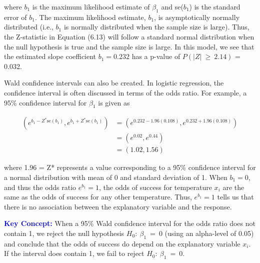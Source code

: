 \documentclass[
]{report}
\begin{document}
where \(\scriptstyle b_1\) is the maximum likelihood estimate of \(\scriptstyle \beta_1\) and se(\(\scriptstyle b_1\)) is the standard error of \(\scriptstyle b_1\). The maximum likelihood estimate, \(\scriptstyle b_1\), is asymptotically normally distributed (i.e., \(\scriptstyle b_1\) is normally distributed when the sample size is large). Thus, the Z-statistic in Equation (6.13) will follow a standard normal distribution when the null hypothesis is true and the sample size is large. In this model, we see that the estimated slope coefficient \(\scriptstyle b_1 = 0.232\) has a p-value of \(\scriptstyle P(|Z| \ \geq \ 2.14)\) = 0.032.

Wald confidence intervals can also be created. In logistic regression, the confidence interval is often discussed in terms of the odds ratio. For example, a 95\% confidence interval for \(\scriptstyle \beta_1\) is given as

\begin{equation}
\begin{split}
(e^{b_1 - Z^* \text{se}(b_1)}, e^{b_1 + Z^* \text{se}(b_1)}) &= (e^{0.232 - 1.96(0.108)}, e^{0.232 + 1.96(0.108)}) \\ &= (e^{0.02}, e^{0.44}) \\ &= (1.02, 1.56) 
\end{split}
\tag{6.14}
\end{equation}

where 1.96 = Z* represents a value corresponding to a 95\% confidence interval for a normal distribution with mean of 0 and standard deviation of 1. When \(\scriptstyle b_1 = 0\), and thus the odds ratio \(\scriptstyle e^{b_1} = 1\), the odds of success for temperature \(\scriptstyle x_i\) are the same as the odds of success for any other temperature. Thus, \(\scriptstyle e^{b_1} = 1\) tells us that there is no association between the explanatory variable and the response.

\textbf{\textcolor{blue}{Key Concept:}}
When a 95\% Wald confidence interval for the odds ratio does not contain 1, we reject the null hypothesis \(\scriptstyle H_0: \ \beta_1 \ = \ 0\) (using an alpha-level of 0.05) and conclude that the odds of success do depend on the explanatory variable \(\scriptstyle x_i\). If the interval does contain 1, we fail to reject \(\scriptstyle H_0:\  \beta_1 \ =\  0\).
\end{document}
